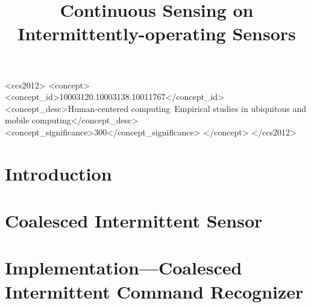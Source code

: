 \documentclass[sigconf, anonymous]{acmart}
\begin{document}
\title{Continuous Sensing on Intermittently-operating Sensors}


\renewcommand{\shortauthors}{A. Majid et al.}


\begin{abstract}

\end{abstract}

\begin{CCSXML}
<ccs2012>
<concept>
<concept_id>10003120.10003138.10011767</concept_id>
<concept_desc>Human-centered computing~Empirical studies in ubiquitous and mobile computing</concept_desc>
<concept_significance>300</concept_significance>
</concept>
</ccs2012>
\end{CCSXML}


\maketitle


\section{Introduction}
\label{sec:introduction}


% 

\section{Coalesced Intermittent Sensor}
\label{sec:coalInterSen}


\section{Implementation---Coalesced Intermittent Command Recognizer}
\label{sec:disMic}

\end{document}

